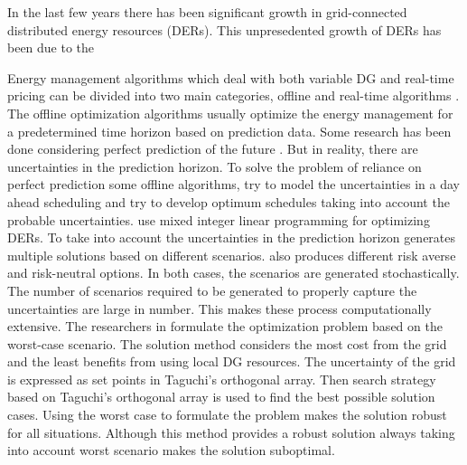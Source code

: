 In the last few years there has been significant growth in grid-connected distributed energy resources (DERs). This unpresedented growth of DERs has been due to the 

Energy management algorithms which deal with both variable DG and real-time pricing can be divided into two main categories, offline and real-time algorithms \cite{rt_shi_2017}. The offline optimization algorithms usually optimize the energy management for a predetermined time horizon based on prediction data. Some research has been done considering perfect prediction of the future \cite{Off_1,off_2,off_3,off_4}. But in reality, there are uncertainties in the prediction horizon. To solve the problem of reliance on perfect prediction some offline algorithms, try to model the uncertainties in a day ahead scheduling and try to develop optimum schedules taking into account the probable uncertainties. \cite{ous_1,ous_2} use mixed integer linear programming for optimizing DERs. To take into account the uncertainties in the prediction horizon \cite{ous_2} generates multiple solutions based on different scenarios. \cite{ous_1} also produces different risk averse and risk-neutral options. In both cases, the scenarios are generated stochastically. The number of scenarios required to be generated to properly capture the uncertainties are large in number. This makes these process computationally extensive. The researchers in \cite{ous_3} formulate the optimization problem based on the worst-case scenario. The solution method considers the most cost from the grid and the least benefits from using local DG resources. The uncertainty of the grid is expressed as set points in Taguchi’s orthogonal array. Then search strategy based on Taguchi’s orthogonal array is used to find the best possible solution cases. Using the worst case to formulate the problem makes the solution robust for all situations. Although this method provides a robust solution always taking into account worst scenario makes the solution suboptimal. 

